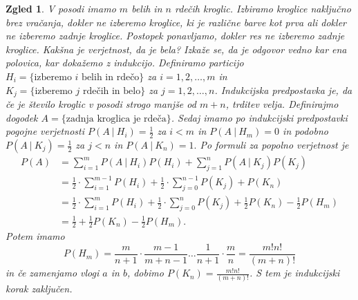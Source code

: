 \documentclass[10pt, a4paper]{article}
\newtheorem{zgled}[izr]{Zgled}
\begin{document}
\begin{zgled}
  V posodi imamo $m$ belih in $n$ rdečih kroglic. Izbiramo kroglice naključno brez vračanja,
  dokler ne izberemo kroglice, ki je različne barve kot prva ali dokler ne izberemo zadnje kroglice.
  Postopek ponavljamo, dokler res ne izberemo zadnje kroglice. Kakšna je verjetnost, da je bela?
  Izkaže se, da je odgovor vedno kar ena polovica, kar dokažemo z indukcijo.
  Definiramo particijo $H_i = \{\text{izberemo $i$ belih in rdečo}\}$ za $i = 1, 2, \dots, m$ in $K_j = \{\text{izberemo $j$ rdečih in belo}\}$
  za $j = 1, 2, \dots, n$.
  Indukcijska predpostavka je, da če je število kroglic v posodi strogo manjše od $m + n$, trditev velja.
  Definirajmo dogodek $A = \{\text{zadnja kroglica je rdeča}\}$.
  Sedaj imamo po indukcijski predpostavki pogojne verjetnosti $P(A\ |\ H_i) = \frac{1}{2}$ za $i < m$ in $P(A\ |\ H_m) = 0$ in podobno 
  $P(A\ |\ K_j) = \frac{1}{2}$ za $j < n$ in $P(A\ |\ K_n) = 1.$
  Po formuli za popolno verjetnost je 
  \begin{align*}
    P(A) &= \sum_{i = 1} ^m P(A\ |\ H_i) P(H_i) + \sum_{j = 1} ^n P(A\ |\ K_j) P(K_j)\\
    &= \frac{1}{2} \cdot \sum_{i = 1} ^{m - 1} P(H_i) + \frac{1}{2} \cdot \sum_{j = 0} ^{n - 1} P(K_j) + P(K_n)\\
    &= \frac{1}{2} \cdot \sum_{i = 1} ^{m} P(H_i) + \frac{1}{2} \cdot \sum_{j = 0} ^{n} P(K_j) + \frac{1}{2} P(K_n) - \frac{1}{2} P(H_m)\\
    &= \frac{1}{2} + \frac{1}{2} P(K_n) - \frac{1}{2} P(H_m).
  \end{align*}
  Potem imamo 
  $$P(H_m) = \frac{m}{n + 1} \cdot \frac{m - 1}{m + n - 1} \dots \frac{1}{n + 1} \cdot \frac{m}{n} = \frac{m! n!}{(m + n)!}$$
  in če zamenjamo vlogi $a$ in $b$, dobimo $P(K_n) = \frac{m! n!}{(m + n)!}$. S tem je indukcijski korak zaključen.
\end{zgled}
\end{document}

